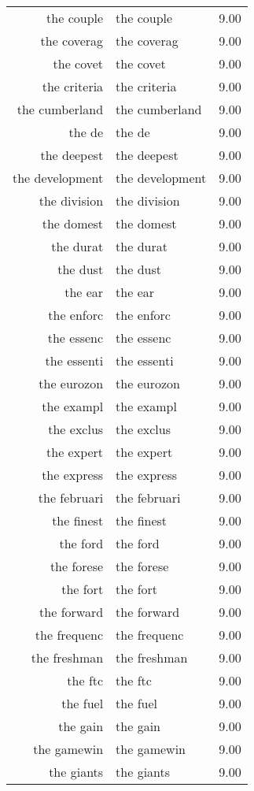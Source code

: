 \begin{table}[ht]
\begin{tabular}{rlr}
  the couple & the couple & 9.00 \\ 
  the coverag & the coverag & 9.00 \\ 
  the covet & the covet & 9.00 \\ 
  the criteria & the criteria & 9.00 \\ 
  the cumberland & the cumberland & 9.00 \\ 
  the de & the de & 9.00 \\ 
  the deepest & the deepest & 9.00 \\ 
  the development & the development & 9.00 \\ 
  the division & the division & 9.00 \\ 
  the domest & the domest & 9.00 \\ 
  the durat & the durat & 9.00 \\ 
  the dust & the dust & 9.00 \\ 
  the ear & the ear & 9.00 \\ 
  the enforc & the enforc & 9.00 \\ 
  the essenc & the essenc & 9.00 \\ 
  the essenti & the essenti & 9.00 \\ 
  the eurozon & the eurozon & 9.00 \\ 
  the exampl & the exampl & 9.00 \\ 
  the exclus & the exclus & 9.00 \\ 
  the expert & the expert & 9.00 \\ 
  the express & the express & 9.00 \\ 
  the februari & the februari & 9.00 \\ 
  the finest & the finest & 9.00 \\ 
  the ford & the ford & 9.00 \\ 
  the forese & the forese & 9.00 \\ 
  the fort & the fort & 9.00 \\ 
  the forward & the forward & 9.00 \\ 
  the frequenc & the frequenc & 9.00 \\ 
  the freshman & the freshman & 9.00 \\ 
  the ftc & the ftc & 9.00 \\ 
  the fuel & the fuel & 9.00 \\ 
  the gain & the gain & 9.00 \\ 
  the gamewin & the gamewin & 9.00 \\ 
  the giants & the giants & 9.00 \\ 

\end{tabular}
\end{table}

